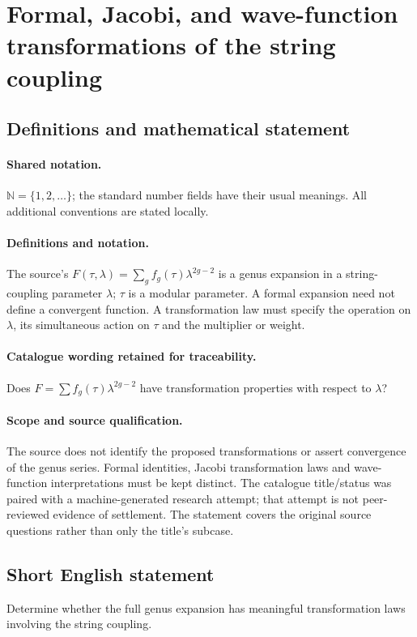 \documentclass[11pt]{article}
\begin{document}
\section{Formal, Jacobi, and wave-function transformations of the string coupling}\label{statement}

\subsection{Definitions and mathematical statement}

\paragraph{Shared notation.}$\mathbb N=\{1,2,\ldots\}$; the standard number fields have their usual meanings. All additional conventions are stated locally.


\paragraph{Definitions and notation.}The source’s $F(\tau,\lambda)=\sum_g f_g(\tau)\lambda^{2g-2}$ is a genus expansion in a string-coupling parameter $\lambda$; $\tau$ is a modular parameter. A formal expansion need not define a convergent function. A transformation law must specify the operation on $\lambda$, its simultaneous action on $\tau$ and the multiplier or weight.

\paragraph{Catalogue wording retained for traceability.}
Does $F= \sum f_g(\tau)\lambda^{2g-2}$ have transformation properties with respect to $\lambda$?
\paragraph{Scope and source qualification.}The source does not identify the proposed transformations or assert convergence of the genus series. Formal identities, Jacobi transformation laws and wave-function interpretations must be kept distinct. The catalogue title/status was paired with a machine-generated research attempt; that attempt is not peer-reviewed evidence of settlement. The statement covers the original source questions rather than only the title’s subcase.
\subsection{Short English statement}
Determine whether the full genus expansion has meaningful transformation laws involving the string coupling.
\end{document}
